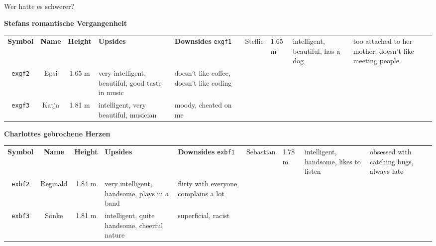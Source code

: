 \begin{frame}{Wer hatte es schwerer?}
%
\begin{center}
\scriptsize
\textbf{Stefans romantische Vergangenheit}
\begin{tabular}{c|ccp{.3\linewidth}p{.3\linewidth}}
	\textbf{Symbol} & \textbf{Name} & \textbf{Height} & \textbf{Upsides}                                 & \textbf{Downsides} \tabcrlf
	\texttt{exgf1}  & Steffie       & 1.65 m          & intelligent, beautiful, has a dog                & too attached to her mother, 
																																																				doesn't like meeting people \\
	\texttt{exgf2}  & Epsi          & 1.65 m          & very intelligent, beautiful, good taste in music & doesn't like coffee, doesn't like coding \\
	\texttt{exgf3}  & Katja         & 1.81 m          & intelligent, very beautiful, musician            & moody, cheated on me
\end{tabular}
\end{center}

\begin{center}
\scriptsize
\textbf{Charlottes gebrochene Herzen}
\begin{tabular}{c|ccp{.3\linewidth}p{.3\linewidth}}
	\textbf{Symbol} & \textbf{Name} & \textbf{Height} & \textbf{Upsides}                                 & \textbf{Downsides} \tabcrlf
	\texttt{exbf1}  & Sebastian     & 1.78 m          & intelligent, handsome, likes to listen           & obsessed with catching bugs, always late \\
	\texttt{exbf2}  & Reginald      & 1.84 m          & very intelligent, handsome, plays in a band      & flirty with everyone, complains a lot \\
	\texttt{exbf3}  & Sönke         & 1.81 m          & intelligent, quite handsome, cheerful nature     & superficial, racist
\end{tabular}
\end{center}
%
\end{frame}


